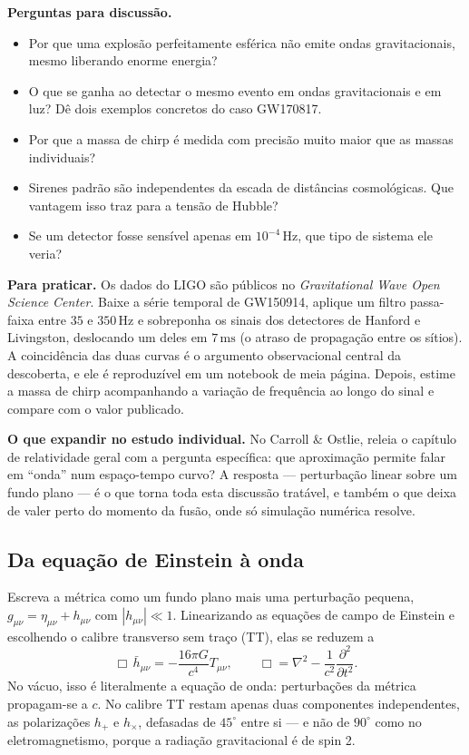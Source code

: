 \documentclass[11pt,a4paper]{article}
\begin{document}
\textbf{Perguntas para discussão.}
\begin{itemize}
\item Por que uma explosão perfeitamente esférica não emite ondas gravitacionais, mesmo liberando enorme energia?
\item O que se ganha ao detectar o mesmo evento em ondas gravitacionais e em luz? Dê dois exemplos concretos do caso GW170817.
\item Por que a massa de chirp é medida com precisão muito maior que as massas individuais?
\item Sirenes padrão são independentes da escada de distâncias cosmológicas. Que vantagem isso traz para a tensão de Hubble?
\item Se um detector fosse sensível apenas em $10^{-4}\,\mathrm{Hz}$, que tipo de sistema ele veria?
\end{itemize}

\textbf{Para praticar.} Os dados do LIGO são públicos no \textit{Gravitational Wave Open Science Center}. Baixe a série temporal de GW150914, aplique um filtro passa-faixa entre $35$ e $350\,\mathrm{Hz}$ e sobreponha os sinais dos detectores de Hanford e Livingston, deslocando um deles em $7\,\mathrm{ms}$ (o atraso de propagação entre os sítios). A coincidência das duas curvas é o argumento observacional central da descoberta, e ele é reproduzível em um notebook de meia página. Depois, estime a massa de chirp acompanhando a variação de frequência ao longo do sinal e compare com o valor publicado.

\textbf{O que expandir no estudo individual.} No Carroll \& Ostlie, releia o capítulo de relatividade geral com a pergunta específica: que aproximação permite falar em ``onda'' num espaço-tempo curvo? A resposta --- perturbação linear sobre um fundo plano --- é o que torna toda esta discussão tratável, e também o que deixa de valer perto do momento da fusão, onde só simulação numérica resolve.

\subsection*{Da equação de Einstein à onda}

Escreva a métrica como um fundo plano mais uma perturbação pequena, $g_{\mu\nu}=\eta_{\mu\nu}+h_{\mu\nu}$ com $|h_{\mu\nu}|\ll1$. Linearizando as equações de campo de Einstein e escolhendo o calibre transverso sem traço (TT), elas se reduzem a
\[
\Box\,\bar{h}_{\mu\nu}=-\frac{16\pi G}{c^{4}}T_{\mu\nu},
\qquad
\Box=\nabla^{2}-\frac{1}{c^{2}}\frac{\partial^{2}}{\partial t^{2}}.
\]
No vácuo, isso é literalmente a equação de onda: perturbações da métrica propagam-se a $c$. No calibre TT restam apenas duas componentes independentes, as polarizações $h_+$ e $h_\times$, defasadas de $45^\circ$ entre si --- e não de $90^\circ$ como no eletromagnetismo, porque a radiação gravitacional é de spin 2.
\end{document}
